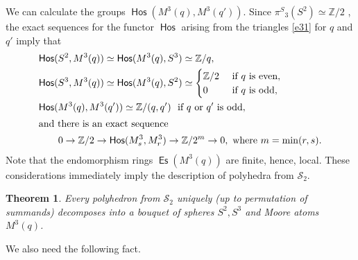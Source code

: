 \documentclass[12pt,a4paper]{amsart}
\newtheorem{theorem}{Theorem}[section]
\theoremstyle{definition}
\theoremstyle{remark}
\numberwithin{equation}{section}
\begin{document}
 We can calculate the groups ${\mathop\mathsf{Hos}\nolimits}(M^3(q),M^3(q'))$. Since ${\pi^S}_3(S^2)\simeq{\mathbb Z}/2$
 \cite[Theorem~15.1]{hu}, the exact sequences for the functor ${\mathop\mathsf{Hos}\nolimits}$ arising from the triangles
 \eqref{e31} for $q$ and $q'$ imply that
 \begin{align} 
 &{\mathop\mathsf{Hos}\nolimits}(S^2,M^3(q)) \simeq {\mathop\mathsf{Hos}\nolimits}(M^3(q),S^3) \simeq{\mathbb Z}/q,  \notag \\
 &{\mathop\mathsf{Hos}\nolimits}(S^3,M^3(q)) \simeq {\mathop\mathsf{Hos}\nolimits}(M^3(q),S^2) \simeq
 \begin{cases}
  {\mathbb Z}/2 &\text{ if } q \text{ is even},\\
  0	&\text{ if } q \text{ is odd},
 \end{cases}  \notag\\
 &{\mathop\mathsf{Hos}\nolimits}(M^3(q),M^3(q')) \simeq {\mathbb Z}/(q,q') \ \text{ if $q$ or $q'$ is odd},  \notag\\
 \intertext{and there is an exact sequence}  \label{e32}
 &\hskip2em 0 \to {\mathbb Z}/2 \to {\mathop\mathsf{Hos}\nolimits}(M^3_s,M^3_r) \to {\mathbb Z}/2^m \to 0, \text{ where } m=\min(r,s).
 \end{align}
 Note that the endomorphism rings ${\mathop\mathsf{Es}\nolimits}(M^3(q))$ are finite, hence, local. These considerations
 immediately imply the description of polyhedra from ${\mathscr S}_2$.

 \begin{theorem}\label{31}
  Every polyhedron from ${\mathscr S}_2$ uniquely (up to permutation of summands) decomposes into a 
 bouquet of spheres $S^2,S^3$ and Moore atoms $M^3(q)$.
 \end{theorem}
 
 We also need the following fact. 
\end{document}
